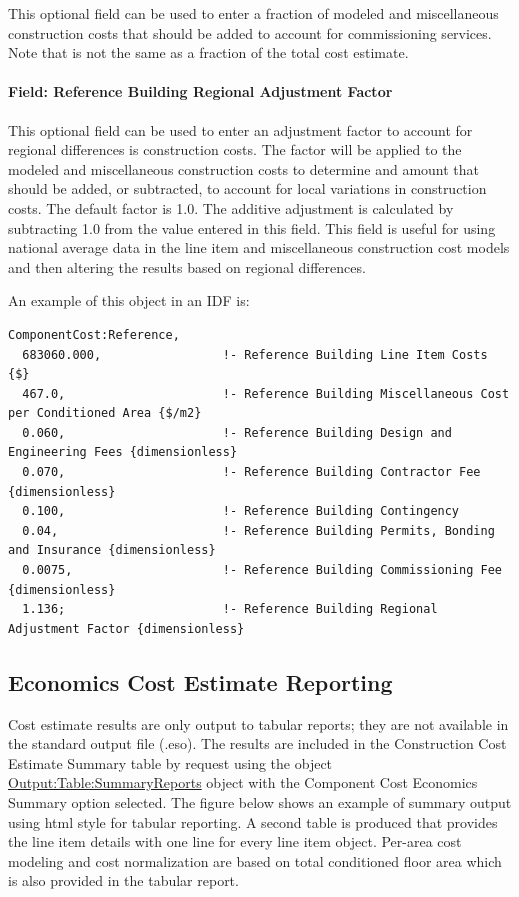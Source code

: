 This optional field can be used to enter a fraction of modeled and miscellaneous construction costs that should be added to account for commissioning services. Note that is not the same as a fraction of the total cost estimate.

\paragraph{Field: Reference Building Regional Adjustment Factor}\label{field-reference-building-regional-adjustment-factor}

This optional field can be used to enter an adjustment factor to account for regional differences is construction costs. The factor will be applied to the modeled and miscellaneous construction costs to determine and amount that should be added, or subtracted, to account for local variations in construction costs. The default factor is 1.0. The additive adjustment is calculated by subtracting 1.0 from the value entered in this field. This field is useful for using national average data in the line item and miscellaneous construction cost models and then altering the results based on regional differences.

An example of this object in an IDF is:

\begin{lstlisting}
ComponentCost:Reference,
  683060.000,                 !- Reference Building Line Item Costs {$}
  467.0,                      !- Reference Building Miscellaneous Cost per Conditioned Area {$/m2}
  0.060,                      !- Reference Building Design and Engineering Fees {dimensionless}
  0.070,                      !- Reference Building Contractor Fee {dimensionless}
  0.100,                      !- Reference Building Contingency
  0.04,                       !- Reference Building Permits, Bonding and Insurance {dimensionless}
  0.0075,                     !- Reference Building Commissioning Fee {dimensionless}
  1.136;                      !- Reference Building Regional Adjustment Factor {dimensionless}
\end{lstlisting}

\subsection{Economics Cost Estimate Reporting}\label{economics-cost-estimate-reporting}

Cost estimate results are only output to tabular reports; they are not available in the standard output file (.eso). The results are included in the Construction Cost Estimate Summary table by request using the object \hyperref[outputtablesummaryreports]{Output:Table:SummaryReports} object with the Component Cost Economics Summary option selected. The figure below shows an example of summary output using html style for tabular reporting. A second table is produced that provides the line item details with one line for every line item object. Per-area cost modeling and cost normalization are based on total conditioned floor area which is also provided in the tabular report.

